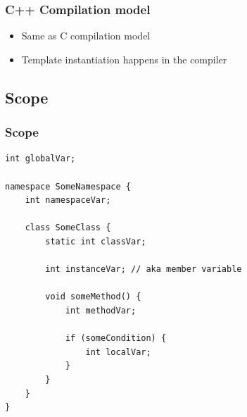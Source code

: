 \documentclass[table]{beamer}
\newcommand{\declarelesson}{\textbf{\color{themegreen}{Lesson:}} }
\begin{document}
\begin{frame}
    \frametitle{\declarelesson C++ Compilation model}
    \begin{itemize}
        \item Same as C compilation model
        \item Template instantiation happens in the compiler
    \end{itemize}
\end{frame}


\subsection{Scope}
\frame{\subsectionpage}

\begin{frame}[fragile]
    \frametitle{\declarelesson Scope}
    \begin{lstlisting}[basicstyle=\scriptsize\ttfamily\color{codefg}]
int globalVar;

namespace SomeNamespace {
    int namespaceVar;

    class SomeClass {
        static int classVar;

        int instanceVar; // aka member variable

        void someMethod() {
            int methodVar;

            if (someCondition) {
                int localVar;
            }
        }
    }
}
    \end{lstlisting}
\end{frame}
\end{document}
